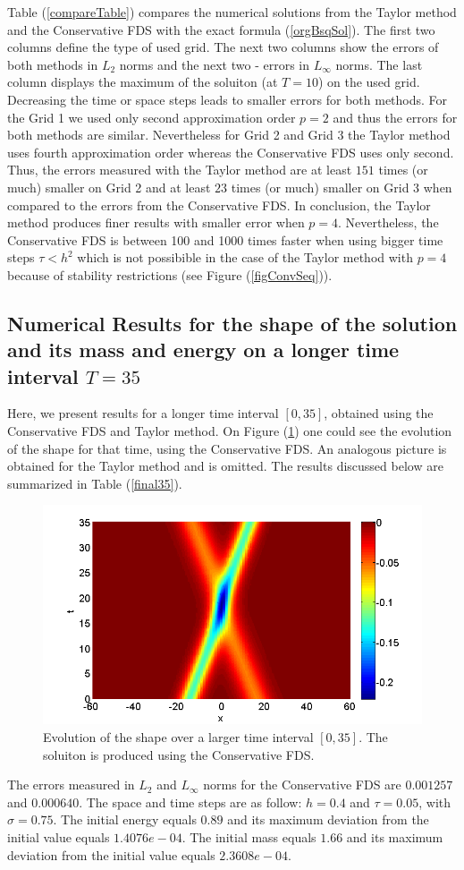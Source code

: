 \documentclass[%
 aip,
cp,  
 amsmath,amssymb,
 reprint,
]{iopconfser}
\newcommand{\rf}[1]{(\ref{#1})}
\begin{document}
Table \rf{compareTable} compares the numerical solutions from the Taylor method and the Conservative FDS with the exact formula \rf{orgBsqSol}. The first two columns define the type of used grid. The next two columns show the errors of both methods in $L_2$ norms and the next two - errors in $L_\infty$ norms. The last column displays the maximum of the soluiton (at $T=10$) on the used grid. Decreasing the time or space steps leads to smaller errors
for both methods. For the Grid 1 we used only second approximation order $p=2$ and thus the errors for both methods are similar. Nevertheless for Grid 2 and Grid 3 the Taylor method uses fourth approximation order whereas 
the Conservative FDS uses only second. Thus, the errors measured with the Taylor method are at least $151$ times (or much) smaller on Grid 2 and at least $23$ times (or much) smaller on Grid 3 when compared to the errors from the Conservative FDS. In conclusion, the Taylor method produces finer results with smaller error when $p=4$. Nevertheless, the Conservative FDS is between 100 and 1000 times faster when using bigger time steps $\tau < h^2$ which is not possibible in the case of the Taylor method with $p=4$ because of stability restrictions (see Figure \rf{figConvSeq}).
\fi
\subsection{Numerical Results for the shape of the solution and its mass and energy on a longer time interval $T = 35$}

Here, we present results for a longer time interval $[0, 35]$, obtained using the Conservative FDS and Taylor method. On Figure \rf{sol35} one could see the evolution of the shape for that time, using the Conservative FDS. An analogous picture is obtained for the Taylor method and is omitted. The results discussed below are summarized in Table \rf{final35}. 

\begin{figure}[H]\vspace{0.2cm}
	\centering
	\includegraphics[width=0.7\linewidth]{solution2.png}
\caption{Evolution of the shape over a larger time interval $[0, 35]$. The soluiton is produced using the Conservative FDS.}
\label{sol35}
\end{figure}
The errors measured in $L_2$ and $L_\infty$ norms for the Conservative FDS are $0.001257$ and $0.000640$. The space and time steps are as follow: $h = 0.4$ and  $\tau = 0.05$, with $\sigma = 0.75$. The initial energy equals $0.89$ and its maximum deviation from the initial value equals $1.4076e-04$. The initial mass equals $1.66$ and its maximum deviation from the initial value equals $2.3608e-04$.
\end{document}
